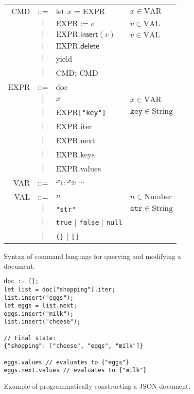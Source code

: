 \documentclass[10pt,journal,compsoc]{IEEEtran}
\begin{document}
\begin{figure}
\centering
\begin{tabular}{rcll}
CMD & ::= & \textsf{let} $x$ = EXPR & $x \in \mathrm{VAR}$ \\
& $|$ & $\mathrm{EXPR} := v$ & $v \in \mathrm{VAL}$ \\
& $|$ & $\mathrm{EXPR}.\mathsf{insert}(v)$ & $v \in \mathrm{VAL}$ \\
& $|$ & $\mathrm{EXPR}.\mathsf{delete}$ \\
& $|$ & \textsf{yield} \\
& $|$ & CMD; CMD \vspace{0.5em}\\
EXPR & ::= & \textsf{doc} \\
& $|$ & $x$ & $x \in \mathrm{VAR}$ \\
& $|$ & EXPR\verb|["key"]| & $\mathtt{key} \in \mathrm{String}$ \\
& $|$ & EXPR.\textsf{iter} \\
& $|$ & EXPR.\textsf{next} \\
& $|$ & EXPR.\textsf{keys} \\
& $|$ & EXPR.\textsf{values} \vspace{0.5em}\\
VAR & ::= & ${x_1, x_2, \dots}$ \vspace{0.5em}\\
VAL & ::= & $n$ & $n \in \mathrm{Number}$ \\
& $|$ & \verb|"str"| & $\mathtt{str} \in \mathrm{String}$ \\
& $|$ & \verb|true| $|$ \verb|false| $|$ \verb|null| \\
& $|$ & \verb|{}| $|$ \verb|[]|
\end{tabular}
\caption{Syntax of command language for querying and modifying a document.}\label{fig:local-syntax}
\end{figure}

\begin{figure}
\centering
\begin{verbatim}
doc := {};
let list = doc["shopping"].iter;
list.insert("eggs");
let eggs = list.next;
eggs.insert("milk");
list.insert("cheese");

// Final state:
{"shopping": ["cheese", "eggs", "milk"]}

eggs.values // evaluates to {"eggs"}
eggs.next.values // evaluates to {"milk"}
\end{verbatim}
\caption{Example of programmatically constructing a JSON document.}\label{fig:make-doc}
\end{figure}
\end{document}

